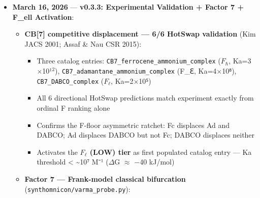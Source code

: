 \documentclass[12pt,a4paper]{article}
\begin{document}
\begin{itemize}
\begin{itemize}
    \item \textbf{New topology symbols}: $T_{|}$ (LINEAR), $T_{\perp}$ (BRANCHED), $T_{\in}$ (NETWORK) --- registered in \texttt{Topology.from\_symbol()}, documented in SYNTHONICON.md §II
    \item \textbf{\texttt{to\_notation()} always includes $\Phi$}: defaults to \texttt{Phi\_sub} when \texttt{criticality\_phase} is unset; S appended as 10th position
    \item \textbf{\texttt{algebra.py} \texttt{is\_degenerate} fix}: \texttt{CriticalityPhase.is\_degenerate} is a \texttt{@property} --- removed erroneous \texttt{()} call at 4 sites
    \item \texttt{\_\_init\_\_.py} version: \texttt{0.3.5}; new exports: \texttt{SynthonM}, \texttt{SynScript}, \texttt{SynParseError}, \texttt{UnknownAssertion}, \texttt{run\_syn\_file}, all monad combinators
\end{itemize}

    \item 
    \textbf{March 16, 2026} --- \textbf{v0.3.3: Experimental Validation + Factor 7 + F\_ell Activation}:

    \begin{itemize}
    \item 
    \textbf{CB{[}7{]} competitive displacement --- 6/6 HotSwap validation} (Kim JACS 2001; Assaf \& Nau CSR 2015):

    \begin{itemize}
    \item Three catalog entries: \texttt{CB7\_ferrocene\_ammonium\_complex} ($F_{\hbar}$, Ka=3$\times$10¹$^{2}$), \texttt{CB7\_adamantane\_ammonium\_complex} (F\_ℇ, Ka=4$\times$10⁸), \texttt{CB7\_DABCO\_complex} ($F_{\ell}$, Ka=2$\times$10⁵)
    \item All 6 directional HotSwap predictions match experiment exactly from ordinal F ranking alone
    \item Confirms the F-floor asymmetric ratchet: Fc displaces Ad and DABCO; Ad displaces DABCO but not Fc; DABCO displaces neither
    \item Activates the \textbf{$F_{\ell}$ (LOW) tier} as first populated catalog entry --- Ka threshold \textless{} \textasciitilde{}10⁷ M⁻¹ ($\Delta$G $\approx$ $-$40 kJ/mol)
\end{itemize}

    \item 
    \textbf{Factor 7 --- Frank-model classical bifurcation} (\texttt{synthomnicon/varma\_probe.py}):


\end{itemize}
\end{itemize}
\end{document}

